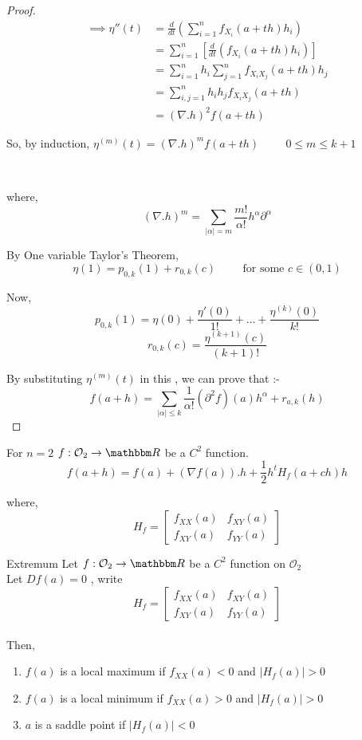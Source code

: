 \documentclass[../Analysis-3]{subfiles}
\begin{document}
\begin{proof}
\begin{align*}
    \implies \eta''(t) &= \frac{d}{dt}\left(\sum_{i=1}^n f_{X_i} (a+th) h_i\right) \\
    &= \sum_{i=1}^n \left[\frac{d}{dt}\left( f_{X_i} (a+th) h_i\right)\right] \\
    &= \sum_{i=1}^n h_i \sum_{j=1}^n f_{X_i X_j} (a+th) h_j \\
    &= \sum_{i,j=1}^n h_i h_jf_{X_i X_j} (a+th) \\
    &= (\nabla . h)^2 f (a+th)
\end{align*}

So, by induction, $\eta^{(m)}(t) = (\nabla . h)^m f (a+th) \hspace{1cm} 0 \leq m \leq k+1 $

\

where, \[(\nabla . h)^m = \sum_{| \alpha | = m } \frac{m!}{\alpha!} h^{\alpha} \partial^{\alpha}\]

By One variable Taylor's Theorem, 
\[ \eta(1) = p_{0,k}(1) + r_{0,k} (c) \hspace{1cm} \text{for some  } c \in (0,1) \]

Now, \[ p_{0,k}(1) = \eta(0) + \frac{\eta '(0)}{1!} + \ldots + \frac{\eta^{(k)}(0)}{k!}\]
\[ r_{0,k} (c) = \frac{\eta^{(k+1)}(c)}{(k+1)!} \]

By substituting $\eta^{(m)}(t)$ in this , we can prove that :-
\[ f(a+h) = \sum_{| \alpha | \leq k } \frac{1}{\alpha !} ({\partial}^2 f ) (a) h^{\alpha} + r_{a,k} (h) \]
\end{proof}

\begin{Eg}{For $n=2$}{}
 $f : \mathcal{O}_2 \to \R$ be a $C^2$ function.
 \[ f(a+h) = f(a) + \left(\nabla f(a)\right).h + \frac{1}{2}h^t H_f(a+ch)h \label{eq_pj} \tag{*} \]

 where, \[ H_f =  \begin{bmatrix}
    f_{X X}(a) & f_{X Y}(a) \\
    f_{X Y}(a) & f_{Y Y}(a)
 \end{bmatrix} \]
\end{Eg}

\begin{Thm}{Extremum}{}
Let $f : \mathcal{O}_2 \to \R$ be a $C^2$ function on $\mathcal{O}_2$ \\ 
Let $Df(a) = 0$ , write \[ H_f =  \begin{bmatrix}
    f_{X X}(a) & f_{X Y}(a) \\
    f_{X Y}(a) & f_{Y Y}(a)
 \end{bmatrix} \] \\ 
 Then, \begin{enumerate}
    \item $f(a)$ is a local maximum if $f_{X X} (a) < 0$ and $|H_f(a)| > 0$ \\
    \item $f(a)$ is a local minimum if $f_{X X} (a) > 0$ and $|H_f(a)| > 0$ \\
    \item $a$ is a saddle point if $|H_f(a)| < 0$
 \end{enumerate}
\end{Thm}
\end{document}
